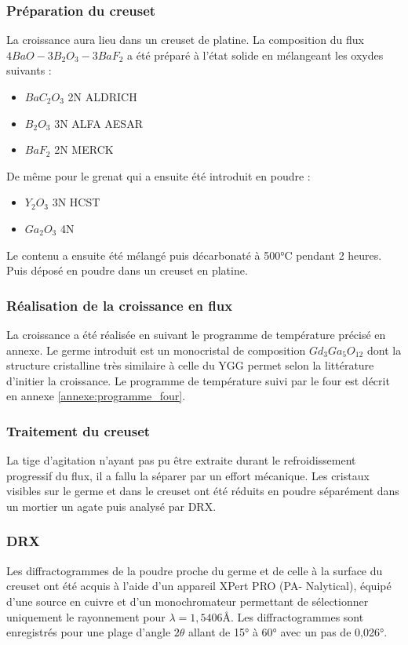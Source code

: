 \documentclass{rapportENSCP}
\begin{document}
\subsubsection{Préparation du creuset}
La croissance aura lieu dans un creuset de platine. La composition du flux $4BaO-3B_2O_3-3BaF_2$ a été préparé à l'état solide en mélangeant les oxydes suivants :

\begin{itemize}
    \item $BaC_2O_3$ 2N ALDRICH
    \item $B_2O_3$ 3N ALFA AESAR
    \item $BaF_2$ 2N MERCK
\end{itemize}

De même pour le grenat qui a ensuite été introduit en poudre :

\begin{itemize}
    \item $Y_2O_3$ 3N HCST
    \item $Ga_2O_3$ 4N
\end{itemize}

Le contenu a ensuite été mélangé puis décarbonaté à 500°C pendant 2 heures. Puis déposé en poudre dans un creuset en platine.

\subsubsection{Réalisation de la croissance en flux}
La croissance a été réalisée en suivant le programme de température précisé en annexe. Le germe introduit est un monocristal de composition $Gd_3Ga_5O_12$ dont la structure cristalline très similaire à celle du YGG permet selon la littérature d'initier la croissance. Le programme de température suivi par le four est décrit en annexe \ref{annexe:programme_four}.

\subsubsection{Traitement du creuset}
La tige d’agitation n’ayant pas pu être extraite durant le refroidissement progressif du flux, il a fallu la séparer par un effort mécanique. Les cristaux visibles sur le germe et dans le creuset ont été réduits en poudre séparément dans un mortier un agate puis analysé par DRX.

\subsubsection{DRX}
Les diffractogrammes de la poudre proche du germe et de celle à la surface du creuset ont été acquis à l’aide d’un appareil XPert PRO (PA-
Nalytical), équipé d’une source en cuivre et d’un monochromateur permettant de sélectionner uniquement le rayonnement pour $\lambda = 1, 5406$Å. Les diffractogrammes sont enregistrés pour
une plage d’angle $2\theta$ allant de 15° à 60° avec un pas de 0,026°.
\end{document}
